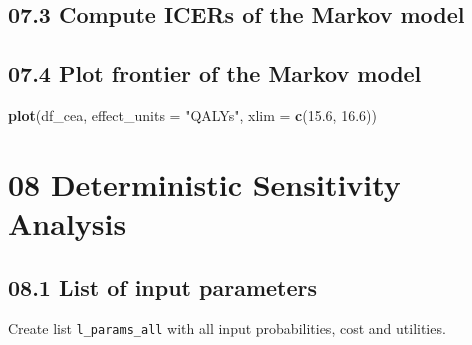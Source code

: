 \documentclass[]{article}
\newenvironment{Shaded}{\begin{snugshade}}{\end{snugshade}}
\newcommand{\KeywordTok}[1]{\textcolor[rgb]{0.13,0.29,0.53}{\textbf{#1}}}
\newcommand{\DataTypeTok}[1]{\textcolor[rgb]{0.13,0.29,0.53}{#1}}
\newcommand{\FloatTok}[1]{\textcolor[rgb]{0.00,0.00,0.81}{#1}}
\newcommand{\StringTok}[1]{\textcolor[rgb]{0.31,0.60,0.02}{#1}}
\newcommand{\OperatorTok}[1]{\textcolor[rgb]{0.81,0.36,0.00}{\textbf{#1}}}
\newcommand{\NormalTok}[1]{#1}
\begin{document}
\subsection{07.3 Compute ICERs of the Markov
model}\label{compute-icers-of-the-markov-model}

\begin{Shaded}
\end{Shaded}

\subsection{07.4 Plot frontier of the Markov
model}\label{plot-frontier-of-the-markov-model}

\begin{Shaded}
\begin{Highlighting}[]
\KeywordTok{plot}\NormalTok{(df_cea, }\DataTypeTok{effect_units =} \StringTok{"QALYs"}\NormalTok{, }\DataTypeTok{xlim =} \KeywordTok{c}\NormalTok{(}\FloatTok{15.6}\NormalTok{, }\FloatTok{16.6}\NormalTok{))}
\end{Highlighting}
\end{Shaded}

\section{08 Deterministic Sensitivity
Analysis}\label{deterministic-sensitivity-analysis}

\subsection{08.1 List of input
parameters}\label{list-of-input-parameters}

Create list \texttt{l\_params\_all} with all input probabilities, cost
and utilities.
\end{document}
